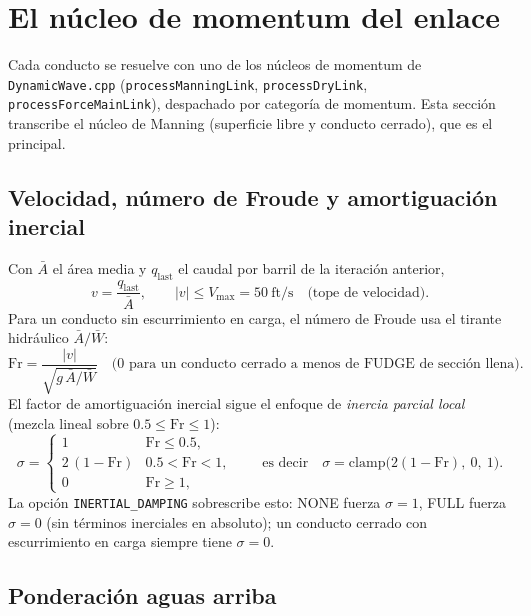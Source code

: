\documentclass[11pt,a4paper]{article}
\newcommand{\st}{\mathrm{s}}
\newcommand{\ft}{\mathrm{ft}}
\begin{document}
\section{El núcleo de momentum del enlace}
\label{sec:momentum-kernel}

Cada conducto se resuelve con uno de los núcleos de momentum de
\texttt{DynamicWave.cpp} (\texttt{process\-Manning\-Link},
\texttt{process\-Dry\-Link}, \texttt{process\-Force\-Main\-Link}), despachado
por categoría de momentum. Esta sección transcribe el núcleo de Manning
(superficie libre y conducto cerrado), que es el principal.

\subsection{Velocidad, número de Froude y amortiguación inercial}

Con $\bar A$ el área media y $q_{\mathrm{last}}$ el caudal por barril de la
iteración anterior,
\begin{equation}
  v = \frac{q_{\mathrm{last}}}{\bar A}, \qquad
  \lvert v \rvert \le V_{\max} = 50\ \ft/\st
  \quad\text{(tope de velocidad).}
\end{equation}
Para un conducto sin escurrimiento en carga, el número de Froude usa el tirante
hidráulico $\bar A/\bar W$:
\begin{equation}
  \mathrm{Fr} = \frac{\lvert v \rvert}{\sqrt{g\,\bar A / \bar W}}
  \quad\text{(0 para un conducto cerrado a menos de FUDGE de sección llena).}
\end{equation}
El factor de amortiguación inercial sigue el enfoque de \emph{inercia parcial
local} (mezcla lineal sobre $0.5 \le \mathrm{Fr} \le 1$):
\begin{equation}
  \sigma =
  \begin{cases}
    1 & \mathrm{Fr} \le 0.5,\\
    2\,(1 - \mathrm{Fr}) & 0.5 < \mathrm{Fr} < 1,\\
    0 & \mathrm{Fr} \ge 1,
  \end{cases}
  \qquad\text{es decir}\quad
  \sigma = \mathrm{clamp}\!\big(2(1-\mathrm{Fr}),\ 0,\ 1\big).
\end{equation}
La opción \texttt{INERTIAL\_DAMPING} sobrescribe esto: NONE fuerza $\sigma = 1$,
FULL fuerza $\sigma = 0$ (sin términos inerciales en absoluto); un conducto
cerrado con escurrimiento en carga siempre tiene $\sigma = 0$.

\subsection{Ponderación aguas arriba}
\end{document}
